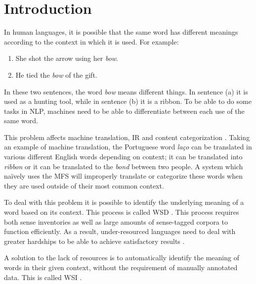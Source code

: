 \chapter{Introduction}


In human languages, it is possible that the same word has different meanings
according to the context in which it is used. For example:

\begin{enumerate}[label=(\alph*)]
 \item She shot the arrow using her \textit{bow}.
 \item He tied the \textit{bow} of the gift.
\end{enumerate}

In these two sentences, the word \textit{bow} means different things. In
sentence (a) it is used as a hunting tool, while in sentence (b) it is a ribbon.
To be able to do some tasks in \ac{NLP}, machines need to be able to
differentiate between each use of the same word.


This problem affects machine translation, \ac{IR} and content categorization
\citep{navigli2009word}. Taking an example of machine translation, the
Portuguese word \textit{laço} can be translated in various different English
words depending on context; it can be translated into \textit{ribbon} or it can
be translated to the \textit{bond} between two people. A system which naïvely
uses the \ac{MFS} will improperly translate or categorize these words when they
are used outside of their most common context.


To deal with this problem it is possible to identify the underlying meaning of a
word based on its context. This process is called \ac{WSD}
\citep{navigli2009word}. This process requires both sense inventories as well as
large amounts of sense-tagged corpora to function efficiently. As a result,
under-resourced languages need to deal with greater hardships to be able to
achieve satisfactory results \citep{ng1997getting}.

A solution to the lack of resources is to automatically identify the meaning of
words in their given context, without the requirement of manually annotated
data. This is called \ac{WSI} \citep{agirre2007semeval}.


